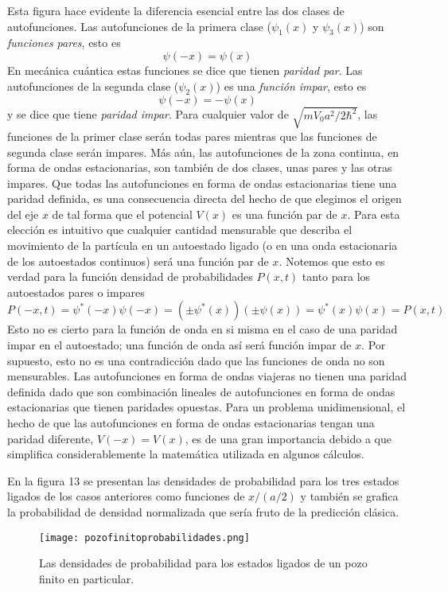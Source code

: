 \documentclass[12pt,a4paper]{article}
\begin{document}
Esta figura hace evidente la diferencia esencial entre las dos clases de autofunciones. Las autofunciones de la primera clase ($\psi _{1}(x)$ y $\psi _{3}(x)$) son \emph{funciones pares}, esto es
\[ \psi (-x)=\psi (x) \]
En mecánica cuántica estas funciones se dice que tienen \emph{paridad par}. Las autofunciones de la segunda clase ($\psi _{2}(x)$) es una \emph{función impar}, esto es
\[ \psi (-x)=-\psi (x) \]
y se dice que tiene \emph{paridad impar}. Para cualquier valor de $\sqrt{mV_{0}a^{2}/2\hbar^{2}}$, las funciones de la primer clase serán todas pares mientras que las funciones de segunda clase serán impares. Más aún, las autofunciones de la zona continua, en forma de ondas estacionarias, son también de dos clases, unas pares y las otras impares. Que todas las autofunciones en forma de ondas estacionarias tiene una paridad definida, es una consecuencia directa del hecho de que elegimos el origen del eje $x$ de tal forma que el potencial $V(x)$ es una función par de $x$. Para esta elección es intuitivo que cualquier cantidad mensurable que describa el movimiento de la partícula en un autoestado ligado (o en una onda estacionaria de los autoestados continuos) será una función par de $x$. Notemos que esto es verdad para la función densidad de probabilidades $P(x,t)$ tanto para los autoestados pares o impares
\[ P(-x,t)=\psi^{\ast}(-x)\psi (-x)=(\pm \psi^{\ast}(x))(\pm \psi(x))=\psi^{\ast}(x)\psi(x)=P(x,t) \]
Esto no es cierto para la función de onda en si misma en el caso de una paridad impar en el autoestado; una función de onda así será función impar de $x$. Por supuesto, esto no es una contradicción dado que las funciones de onda no son mensurables. Las autofunciones en forma de ondas viajeras no tienen una paridad definida dado que son combinación lineales de autofunciones en forma de ondas estacionarias que tienen paridades opuestas. Para un problema unidimensional, el hecho de que las autofunciones en forma de ondas estacionarias tengan una paridad diferente, $V(-x)=V(x)$, es de una gran importancia debido a que simplifica considerablemente la matemática utilizada en algunos cálculos.

En la figura 13 se presentan las densidades de probabilidad para los tres estados ligados de los casos anteriores como funciones de $x/(a/2)$ y también se grafica la probabilidad de densidad normalizada que sería fruto de la predicción clásica.

\begin{figure}[ht!]
\begin{center}
\texttt{[image: pozofinitoprobabilidades.png]}
\caption{Las densidades de probabilidad para los estados ligados de un pozo finito en particular.}
\end{center}
\end{figure}
\end{document}
